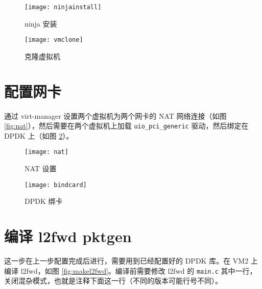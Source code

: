     \begin{figure}[H]
        \centering
        \begin{minipage}{0.45\textwidth}
            \centering
            \texttt{[image: ninjainstall]}
            \caption{ninja 安装}\label{fig:ninjainstall}
        \end{minipage}
        \begin{minipage}{0.3\textwidth}
            \centering
            \texttt{[image: vmclone]}
            \caption{克隆虚拟机}\label{fig:vmclone}
        \end{minipage}
    \end{figure}

    \section{配置网卡}

    通过 virt-manager 设置两个虚拟机为两个网卡的 NAT 网络连接（如图 \ref{fig:nat}），然后需要在两个虚拟机上加载 \verb"uio_pci_generic" 驱动\cite{openuio}，然后绑定在 DPDK 上\cite{bind}（如图 \ref{fig:bindcard}）。

    \begin{figure}[H]
        \centering
        \begin{minipage}{0.48\textwidth}
            \centering
            \texttt{[image: nat]}
            \caption{NAT 设置}\label{fig:nat}
        \end{minipage}
        \begin{minipage}{0.48\textwidth}
            \centering
            \texttt{[image: bindcard]}
            \caption{DPDK 绑卡}\label{fig:bindcard}
        \end{minipage}
    \end{figure}


    \section{编译 l2fwd pktgen}

    这一步在上一步配置完成后进行，需要用到已经配置好的 DPDK 库。在 VM2 上编译 l2fwd，如图 \ref{fig:makel2fwd}。编译前需要修改 l2fwd 的 \verb"main.c" 其中一行，关闭混杂模式\cite{dpdkl2}，也就是注释下面这一行（不同的版本可能行号不同）。


